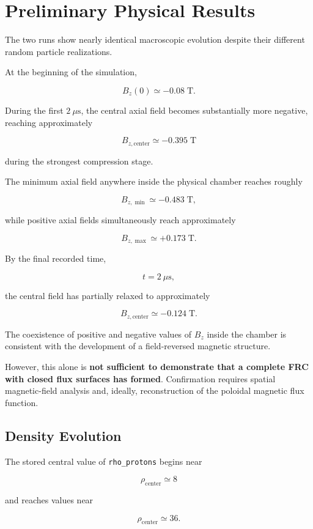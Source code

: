 \documentclass[11pt,a4paper]{article}
\begin{document}
\section{Preliminary Physical Results}

The two runs show nearly identical macroscopic evolution despite their
different random particle realizations.

At the beginning of the simulation,

\[
B_z(0)\simeq -0.08\;\mathrm{T}.
\]

During the first \(2~\mu\mathrm{s}\), the central axial field becomes
substantially more negative, reaching approximately

\[
B_{z,\mathrm{center}}
\simeq -0.395\;\mathrm{T}
\]

during the strongest compression stage.

The minimum axial field anywhere inside the physical chamber reaches roughly

\[
B_{z,\min}\simeq -0.483\;\mathrm{T},
\]

while positive axial fields simultaneously reach approximately

\[
B_{z,\max}\simeq +0.173\;\mathrm{T}.
\]

By the final recorded time,

\[
t=2~\mu\mathrm{s},
\]

the central field has partially relaxed to approximately

\[
B_{z,\mathrm{center}}
\simeq -0.124\;\mathrm{T}.
\]

The coexistence of positive and negative values of \(B_z\) inside the chamber
is consistent with the development of a field-reversed magnetic structure.

However, this alone is \textbf{not sufficient to demonstrate that a complete
FRC with closed flux surfaces has formed}. Confirmation requires spatial
magnetic-field analysis and, ideally, reconstruction of the poloidal magnetic
flux function.

\subsection{Density Evolution}

The stored central value of \texttt{rho\_protons} begins near

\[
\rho_{\mathrm{center}}\simeq 8
\]

and reaches values near

\[
\rho_{\mathrm{center}}\simeq 36.
\]
\end{document}
